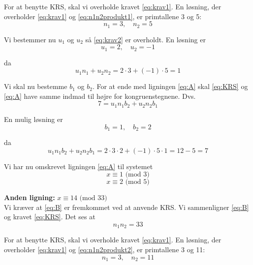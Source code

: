 For at benytte KRS, skal vi overholde kravet \eqref{eq:krav1}. En løsning, der overholder \eqref{eq:krav1} og \eqref{eq:n1n2produkt1}, er primtallene 3 og 5:
\begin{equation*}
n_1 = 3, \quad n_2 = 5
\end{equation*}

Vi bestemmer nu $u_1$ og $u_2$ så \eqref{eq:krav2} er overholdt. En løsning er 
\begin{equation*}
u_1 = 2, \quad u_2 = -1
\end{equation*}

da \begin{equation*}
u_1 n_1 + u_2 n_2 = 2 \cdot 3 + (-1) \cdot 5 = 1
\end{equation*}

Vi skal nu bestemme $b_1$ og $b_2$. For at ende med ligningen \eqref{eq:A} skal \eqref{eq:KRS} og \eqref{eq:A} have samme indmad til højre for kongruenstegnene. Dvs. 
\begin{equation*}
7 = u_1 n_1 b_2 + u_2 n_2 b_1
\end{equation*}

En mulig løsning er 
\begin{equation*}
b_1 = 1, \quad b_2 = 2
\end{equation*}

da
\begin{equation*}
u_1 n_1 b_2 + u_2 n_2 b_1 = 2 \cdot 3 \cdot 2 + (-1) \cdot 5 \cdot 1 = 12 - 5 = 7
\end{equation*}

Vi har nu omskrevet ligningen \eqref{eq:A} til systemet
\begin{equation}\label{eq:A1}
x \equiv 1 \text{ (mod 3)}
\end{equation}
\begin{equation}\label{eq:A2}
x \equiv 2 \text{  (mod 5)}    
\end{equation}


\textbf{Anden ligning:} $x \equiv 14 \text{ (mod 33)}$\\
Vi kræver at \eqref{eq:B} er fremkommet ved at anvende KRS. Vi sammenligner \eqref{eq:B} og kravet \eqref{eq:KRS}. Det ses at
\begin{equation}\label{eq:n1n2produkt2}
n_1 n_2 = 33
\end{equation}

For at benytte KRS, skal vi overholde kravet \eqref{eq:krav1}. En løsning, der overholder \eqref{eq:krav1} og \eqref{eq:n1n2produkt2}, er primtallene 3 og 11:
\begin{equation*}
n_1 = 3, \quad n_2 = 11
\end{equation*}

